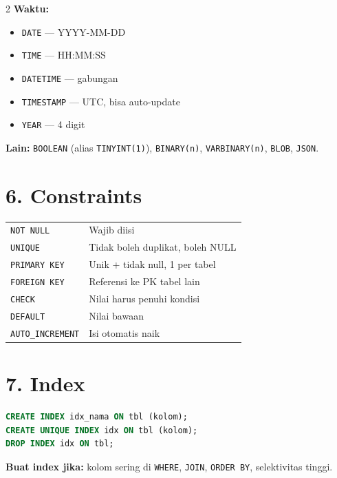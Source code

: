 \documentclass[10pt,a4paper]{article}
\begin{document}
\begin{multicols*}{2}
	\textbf{Waktu:}
	\begin{itemize}
		\item \texttt{DATE} — YYYY-MM-DD
		\item \texttt{TIME} — HH:MM:SS
		\item \texttt{DATETIME} — gabungan
		\item \texttt{TIMESTAMP} — UTC, bisa auto-update
		\item \texttt{YEAR} — 4 digit
	\end{itemize}

	\textbf{Lain:} \texttt{BOOLEAN} (alias \texttt{TINYINT(1)}), \texttt{BINARY(n)}, \texttt{VARBINARY(n)}, \texttt{BLOB}, \texttt{JSON}.

	\section*{6. Constraints}

	\begin{tabularx}{\linewidth}{@{}l X@{}}
		\texttt{NOT NULL}        & Wajib diisi                      \\
		\texttt{UNIQUE}          & Tidak boleh duplikat, boleh NULL \\
		\texttt{PRIMARY KEY}     & Unik + tidak null, 1 per tabel   \\
		\texttt{FOREIGN KEY}     & Referensi ke PK tabel lain       \\
		\texttt{CHECK}           & Nilai harus penuhi kondisi       \\
		\texttt{DEFAULT}         & Nilai bawaan                     \\
		\texttt{AUTO\_INCREMENT} & Isi otomatis naik                \\
	\end{tabularx}

	\section*{7. Index}

	\begin{lstlisting}[language=SQL]
CREATE INDEX idx_nama ON tbl (kolom);
CREATE UNIQUE INDEX idx ON tbl (kolom);
DROP INDEX idx ON tbl;
\end{lstlisting}

	\textbf{Buat index jika:} kolom sering di \texttt{WHERE}, \texttt{JOIN}, \texttt{ORDER BY}, selektivitas tinggi.


\end{multicols*}
\end{document}
